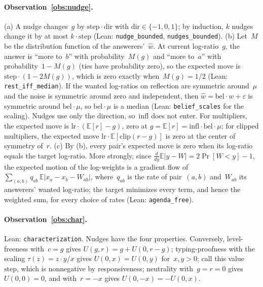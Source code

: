 \documentclass[doubleblind]{ecai}
\theoremstyle{remark}
\newcommand{\step}{\mathrm{step}}
\newcommand{\lr}{\mathrm{lr}}
\newcommand{\bel}{\mathrm{bel}}
\newcommand{\infl}{\mathrm{infl}}
\newcommand{\dir}{\mathrm{dir}}
\begin{document}
\paragraph{Observation~\ref{obs:nudge}.}
(a) A nudge changes~$g$ by $\step\cdot\dir$ with $\dir\in\{-1,0,1\}$; by induction, $k$ nudges change it by at most $k\cdot\step$ (Lean: \texttt{nudge\_bounded}, \texttt{nudges\_bounded}).
(b) Let~$M$ be the distribution function of the answerers'~$\hat w$. At current log-ratio~$g$, the answer is ``more to~$b$'' with probability~$M(g)$ and ``more to~$a$'' with probability~$1-M(g)$ (ties have probability zero), so the expected move is $\step\cdot(1-2M(g))$, which is zero exactly when~$M(g) = 1/2$ (Lean: \texttt{rest\_iff\_median}). If the wanted log-ratios on reflection are symmetric around~$\mu$ and the noise is symmetric around zero and independent, then $\hat w = \bel\cdot w + \varepsilon$ is symmetric around $\bel\cdot\mu$, so $\bel\cdot\mu$ is a median (Lean: \texttt{belief\_scales} for the scaling). Nudges use only the direction, so~$\infl$ does not enter. For multipliers, the expected move is $\lr\cdot(\mathbb{E}[r] - g)$, zero at $g = \mathbb{E}[r] = \infl\cdot\bel\cdot\mu$; for clipped multipliers, the expected move $\lr\cdot\mathbb{E}[\mathrm{clip}(r-g)]$ is zero at the center of symmetry of~$r$.
(c) By (b), every pair's expected move is zero when its log-ratio equals the target log-ratio. More strongly, since $\frac{d}{dy}\mathbb{E}|y - W| = 2\Pr[W<y]-1$, the expected motion of the log-weights is a gradient flow of $\sum_{(a,b)} q_{ab}\,\mathbb{E}\left|x_a - x_b - W_{ab}\right|$, where~$q_{ab}$ is the rate of pair~$(a,b)$ and~$W_{ab}$ its answerers' wanted log-ratio; the target minimizes every term, and hence the weighted sum, for every choice of rates (Lean: \texttt{agenda\_free}).

\paragraph{Observation~\ref{obs:char}.}
Lean: \texttt{characterization}. Nudges have the four properties. Conversely, level-freeness with~$c = g$ gives $U(g,r) = g + U(0,r-g)$; typing-proofness with the scaling $\tau(z) = z\cdot y/x$ gives $U(0,x) = U(0,y)$ for~$x,y>0$; call this value~$\step$, which is nonnegative by responsiveness; neutrality with~$g=r=0$ gives~$U(0,0)=0$, and with~$r = -x$ gives $U(0,-x) = -U(0,x)$.
\end{document}

